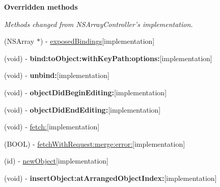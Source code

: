 \begin{Indent}{\bf Overridden methods}\par
{\em Methods changed from N\+S\+Array\+Controller's implementation. }\begin{DoxyCompactItemize}
\item 
(N\+S\+Array $\ast$) -\/ \hyperlink{interface_b_x_synchronized_array_controller_a587959cfaba55da6923523b9ff8fe0cc}{exposed\+Bindings}{\ttfamily  \mbox{[}implementation\mbox{]}}
\item 
\hypertarget{interface_b_x_synchronized_array_controller_a01fbf2129c47c9419045a98c860a14e7}{}(void) -\/ {\bfseries bind\+:to\+Object\+:with\+Key\+Path\+:options\+:}{\ttfamily  \mbox{[}implementation\mbox{]}}\label{interface_b_x_synchronized_array_controller_a01fbf2129c47c9419045a98c860a14e7}

\item 
\hypertarget{interface_b_x_synchronized_array_controller_aa96b15db9625779882a961f8d3c9163b}{}(void) -\/ {\bfseries unbind\+:}{\ttfamily  \mbox{[}implementation\mbox{]}}\label{interface_b_x_synchronized_array_controller_aa96b15db9625779882a961f8d3c9163b}

\item 
\hypertarget{interface_b_x_synchronized_array_controller_a09f09b6bce743650d43483e065eb97af}{}(void) -\/ {\bfseries object\+Did\+Begin\+Editing\+:}{\ttfamily  \mbox{[}implementation\mbox{]}}\label{interface_b_x_synchronized_array_controller_a09f09b6bce743650d43483e065eb97af}

\item 
\hypertarget{interface_b_x_synchronized_array_controller_a4f105106d068a2b480dc5f51af84c705}{}(void) -\/ {\bfseries object\+Did\+End\+Editing\+:}{\ttfamily  \mbox{[}implementation\mbox{]}}\label{interface_b_x_synchronized_array_controller_a4f105106d068a2b480dc5f51af84c705}

\item 
(void) -\/ \hyperlink{interface_b_x_synchronized_array_controller_a612575f2b7d348b5d4e558a4f79ac384}{fetch\+:}{\ttfamily  \mbox{[}implementation\mbox{]}}
\item 
(B\+O\+O\+L) -\/ \hyperlink{interface_b_x_synchronized_array_controller_a75afbfa87d253787cc278a2d923e3835}{fetch\+With\+Request\+:merge\+:error\+:}{\ttfamily  \mbox{[}implementation\mbox{]}}
\item 
(id) -\/ \hyperlink{interface_b_x_synchronized_array_controller_a0c729a7a66ceb0b5cf2aed4c7cc85184}{new\+Object}{\ttfamily  \mbox{[}implementation\mbox{]}}
\item 
\hypertarget{interface_b_x_synchronized_array_controller_a0ae63e814a0a0a5d2e3d995ab71146d0}{}(void) -\/ {\bfseries insert\+Object\+:at\+Arranged\+Object\+Index\+:}{\ttfamily  \mbox{[}implementation\mbox{]}}\label{interface_b_x_synchronized_array_controller_a0ae63e814a0a0a5d2e3d995ab71146d0}


\end{DoxyCompactItemize}
\end{Indent}
